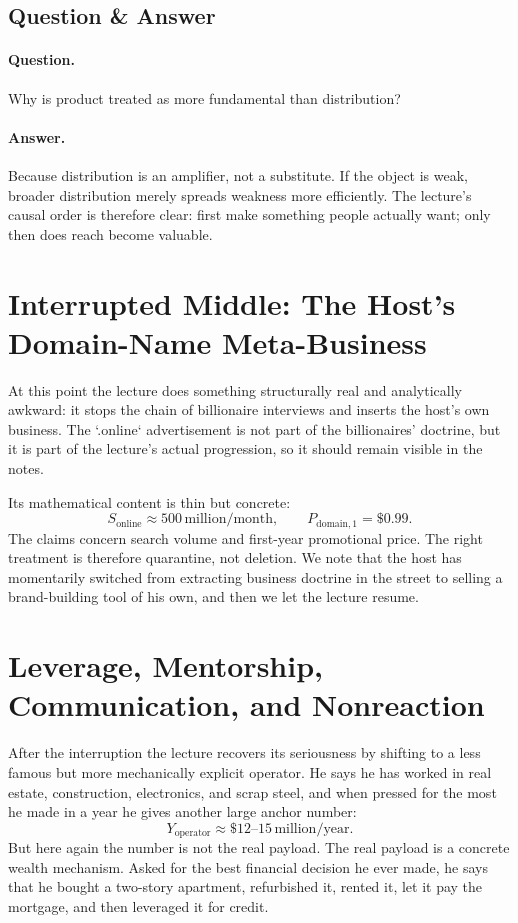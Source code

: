 \subsection{Question \& Answer}

\paragraph{Question.} Why is product treated as more fundamental than distribution?

\paragraph{Answer.} Because distribution is an amplifier, not a substitute. If the object is weak, broader distribution merely spreads weakness more efficiently. The lecture's causal order is therefore clear: first make something people actually want; only then does reach become valuable.

\section{Interrupted Middle: The Host's Domain-Name Meta-Business}

At this point the lecture does something structurally real and analytically awkward: it stops the chain of billionaire interviews and inserts the host's own business. The `.online` advertisement is not part of the billionaires' doctrine, but it is part of the lecture's actual progression, so it should remain visible in the notes.

Its mathematical content is thin but concrete:
\begin{equation}
S_{\text{online}} \approx 500\,\text{million/month},
\qquad
P_{\text{domain},1} = \$0.99.
\end{equation}
The claims concern search volume and first-year promotional price. The right treatment is therefore quarantine, not deletion. We note that the host has momentarily switched from extracting business doctrine in the street to selling a brand-building tool of his own, and then we let the lecture resume.

\section{Leverage, Mentorship, Communication, and Nonreaction}

After the interruption the lecture recovers its seriousness by shifting to a less famous but more mechanically explicit operator. He says he has worked in real estate, construction, electronics, and scrap steel, and when pressed for the most he made in a year he gives another large anchor number:
\begin{equation}
Y_{\text{operator}} \approx \$12\text{--}15\,\text{million/year}.
\end{equation}
But here again the number is not the real payload. The real payload is a concrete wealth mechanism. Asked for the best financial decision he ever made, he says that he bought a two-story apartment, refurbished it, rented it, let it pay the mortgage, and then leveraged it for credit.

